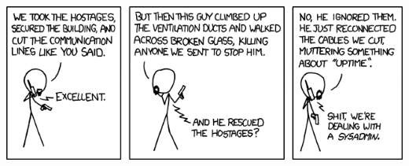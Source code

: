 






\maketitle

\vfill
\begin{center}
\includegraphics[scale=0.5]{images/0705.png}
\end{center}



\newpage
\tableofcontents
\newpage


